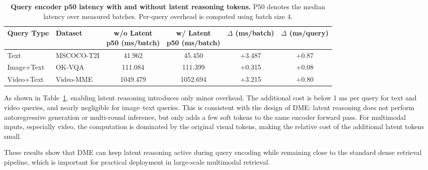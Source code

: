 \begin{table}[t]
\centering
\small
\setlength{\tabcolsep}{5pt}
\renewcommand{\arraystretch}{1.08}
\begin{tabular}{llcccc}
\toprule
\textbf{Query Type} & \textbf{Dataset}
& \shortstack{\textbf{w/o Latent}\\\textbf{p50 (ms/batch)}}
& \shortstack{\textbf{w/ Latent}\\\textbf{p50 (ms/batch)}}
& \shortstack{\textbf{$\Delta$}\\\textbf{(ms/batch)}}
& \shortstack{\textbf{$\Delta$}\\\textbf{(ms/query)}} \\
\midrule
Text & MSCOCO-T2I
& 41.962 & 45.450 & +3.487 & +0.87 \\
Image+Text & OK-VQA
& 111.084 & 111.399 & +0.315 & +0.08 \\
Video+Text & Video-MME
& 1049.479 & 1052.694 & +3.215 & +0.80 \\
\bottomrule
\end{tabular}
\caption{
\textbf{Query encoder p50 latency with and without latent reasoning tokens.} P50 denotes the median latency over measured batches. Per-query overhead is computed using batch size 4.
}
\label{tab:query-latency}
\end{table}

As shown in Table~\ref{tab:query-latency}, enabling latent reasoning introduces only minor overhead. The additional cost is below 1 ms per query for text and video queries, and nearly negligible for image--text queries. This is consistent with the design of DME: latent reasoning does not perform autoregressive generation or multi-round inference, but only adds a few soft tokens to the same encoder forward pass. For multimodal inputs, especially video, the computation is dominated by the original visual tokens, making the relative cost of the additional latent tokens small.

These results show that DME can keep latent reasoning active during query encoding while remaining close to the standard dense retrieval pipeline, which is important for practical deployment in large-scale multimodal retrieval.

